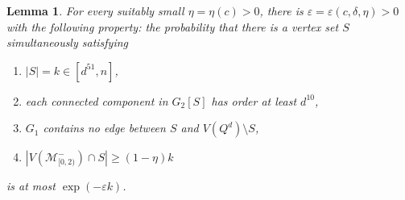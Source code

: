 \documentclass[reqno,final,a4paper]{amsart}
\newtheorem{lemma}[thm]{Lemma}
\theoremstyle{definition}
\newcommand{\cM}{\mathcal{M}}
\def\eps{\varepsilon}
\newcommand{\1}{\mathbbm{1}}
\begin{document}
\begin{lemma}\label{l: no surprises from outside_gen}
For every suitably small $\eta = \eta(c) > 0$, there is $\eps=\eps(c,\delta,\eta)>0$ with the following property: 
the probability that there is a vertex set $S$ simultaneously satisfying 
\begin{enumerate}[label=\emph{(\alph*)}]
    \item $|S| = k\in [d^{51},n]$,
    \item each connected component in $G_2[S]$ has order at least $d^{10}$,
    \item $G_1$ contains no edge between $S$ and $V(Q^d)\setminus S$,
    \item $|V(\cM_{[0,2)}^-)\cap S|\ge (1-\eta)k$
\end{enumerate}
is at most $\exp(-\eps k)$.
\end{lemma}
\end{document}
